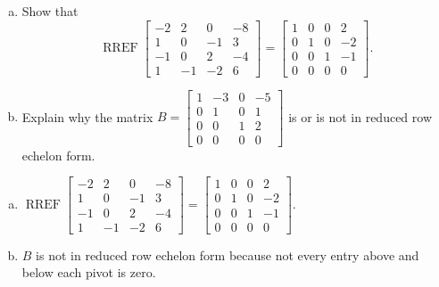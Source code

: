 
\begin{exerciseStatement}

\begin{enumerate}[(a)]
\item Show that \[\operatorname{RREF} \left[\begin{array}{cccc}
-2 & 2 & 0 & -8 \\
1 & 0 & -1 & 3 \\
-1 & 0 & 2 & -4 \\
1 & -1 & -2 & 6
\end{array}\right] = \left[\begin{array}{cccc}
1 & 0 & 0 & 2 \\
0 & 1 & 0 & -2 \\
0 & 0 & 1 & -1 \\
0 & 0 & 0 & 0
\end{array}\right] .\]
\item Explain why the matrix \(B= \left[\begin{array}{cccc}
1 & -3 & 0 & -5 \\
0 & 1 & 0 & 1 \\
0 & 0 & 1 & 2 \\
0 & 0 & 0 & 0
\end{array}\right] \) is or is not in reduced row echelon form.
\end{enumerate}
    
\end{exerciseStatement}
    
\begin{exerciseAnswer} 

\begin{enumerate}[(a)]
\item \(\operatorname{RREF} \left[\begin{array}{cccc}
-2 & 2 & 0 & -8 \\
1 & 0 & -1 & 3 \\
-1 & 0 & 2 & -4 \\
1 & -1 & -2 & 6
\end{array}\right] = \left[\begin{array}{cccc}
1 & 0 & 0 & 2 \\
0 & 1 & 0 & -2 \\
0 & 0 & 1 & -1 \\
0 & 0 & 0 & 0
\end{array}\right] .\)
\item \(B\) is not in reduced row echelon form because not every entry above and below each pivot is zero. 
\end{enumerate}
    
\end{exerciseAnswer}
    
